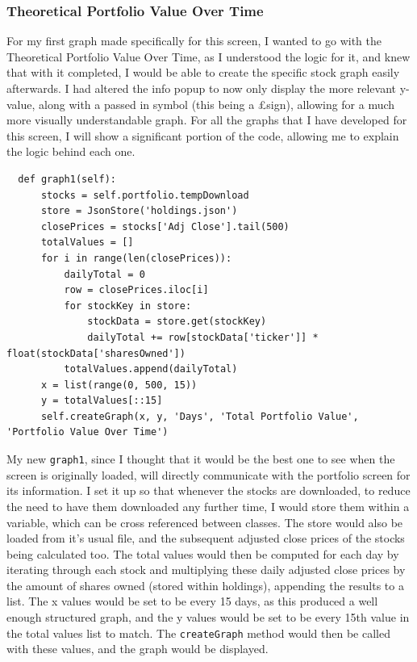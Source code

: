 \documentclass{article}
\begin{document}
\subsubsection{Theoretical Portfolio Value Over Time}
For my first graph made specifically for this screen, I wanted to go with the Theoretical Portfolio Value Over Time, as I understood the logic for it, and knew that with it completed, I would be able to create the specific stock graph easily afterwards. I had altered the info popup to now only display the more relevant y-value, along with a passed in symbol (this being a \pounds sign), allowing for a much more visually understandable graph. For all the graphs that I have developed for this screen, I will show a significant portion of the code, allowing me to explain the logic behind each one.\\\vspace{0.3cm}

\begin{verbatim}
  def graph1(self):
      stocks = self.portfolio.tempDownload
      store = JsonStore('holdings.json')
      closePrices = stocks['Adj Close'].tail(500)
      totalValues = []
      for i in range(len(closePrices)):
          dailyTotal = 0
          row = closePrices.iloc[i]
          for stockKey in store:
              stockData = store.get(stockKey)
              dailyTotal += row[stockData['ticker']] * float(stockData['sharesOwned'])
          totalValues.append(dailyTotal)
      x = list(range(0, 500, 15))
      y = totalValues[::15]
      self.createGraph(x, y, 'Days', 'Total Portfolio Value', 'Portfolio Value Over Time')
\end{verbatim}

\vspace{0.3cm}
My new \texttt{graph1}, since I thought that it would be the best one to see when the screen is originally loaded, will directly communicate with the portfolio screen for its information. I set it up so that whenever the stocks are downloaded, to reduce the need to have them downloaded any further time, I would store them within a variable, which can be cross referenced between classes. The store would also be loaded from it's usual file, and the subsequent adjusted close prices of the stocks being calculated too. The total values would then be computed for each day by iterating through each stock and multiplying these daily adjusted close prices by the amount of shares owned (stored within holdings), appending the results to a list. The x values would be set to be every 15 days, as this produced a well enough structured graph, and the y values would be set to be every 15th value in the total values list to match. The \texttt{createGraph} method would then be called with these values, and the graph would be displayed.\\\vspace{0.3cm}
\end{document}
